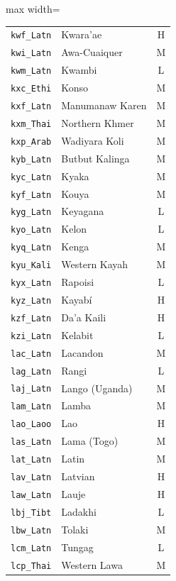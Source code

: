 {\begin{adjustbox}{max width=\textwidth}
\begin{tabular}{llc}
        \texttt{kwf\_Latn} & Kwara'ae & H \\
        \texttt{kwi\_Latn} & Awa-Cuaiquer & M \\
        \texttt{kwm\_Latn} & Kwambi & L \\
        \texttt{kxc\_Ethi} & Konso & M \\
        \texttt{kxf\_Latn} & Manumanaw Karen & M \\
        \texttt{kxm\_Thai} & Northern Khmer & M \\
        \texttt{kxp\_Arab} & Wadiyara Koli & M \\
        \texttt{kyb\_Latn} & Butbut Kalinga & M \\
        \texttt{kyc\_Latn} & Kyaka & M \\
        \texttt{kyf\_Latn} & Kouya & M \\
        \texttt{kyg\_Latn} & Keyagana & L \\
        \texttt{kyo\_Latn} & Kelon & L \\
        \texttt{kyq\_Latn} & Kenga & M \\
        \texttt{kyu\_Kali} & Western Kayah & M \\
        \texttt{kyx\_Latn} & Rapoisi & L \\
        \texttt{kyz\_Latn} & Kayabí & H \\
        \texttt{kzf\_Latn} & Da'a Kaili & H \\
        \texttt{kzi\_Latn} & Kelabit & L \\
        \texttt{lac\_Latn} & Lacandon & M \\
        \texttt{lag\_Latn} & Rangi & L \\
        \texttt{laj\_Latn} & Lango (Uganda) & M \\
        \texttt{lam\_Latn} & Lamba & M \\
        \texttt{lao\_Laoo} & Lao & H \\
        \texttt{las\_Latn} & Lama (Togo) & M \\
        \texttt{lat\_Latn} & Latin & M \\
        \texttt{lav\_Latn} & Latvian & H \\
        \texttt{law\_Latn} & Lauje & H \\
        \texttt{lbj\_Tibt} & Ladakhi & L \\
        \texttt{lbw\_Latn} & Tolaki & M \\
        \texttt{lcm\_Latn} & Tungag & L \\
        \texttt{lcp\_Thai} & Western Lawa & M \\

\end{tabular}
\end{adjustbox}}
